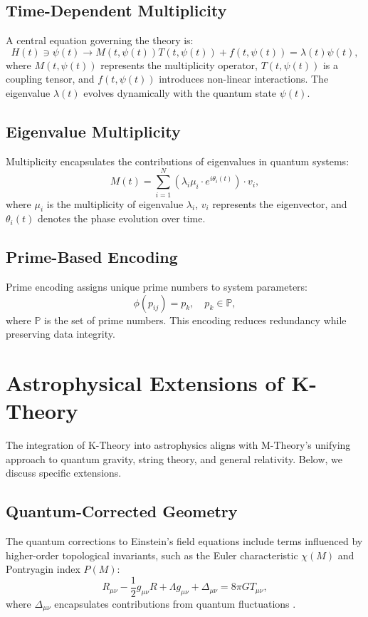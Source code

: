 \documentclass{article}
\theoremstyle{plain}
\begin{document}
\subsection{Time-Dependent Multiplicity}
A central equation governing the theory is:
\begin{equation}
H(t) \ni \psi(t) \to M(t, \psi(t)) T(t, \psi(t)) + f(t, \psi(t)) = \lambda(t) \psi(t),
\end{equation}
where $M(t, \psi(t))$ represents the multiplicity operator, $T(t, \psi(t))$ is a coupling tensor, and $f(t, \psi(t))$ introduces non-linear interactions. The eigenvalue $\lambda(t)$ evolves dynamically with the quantum state $\psi(t)$.

\subsection{Eigenvalue Multiplicity}
Multiplicity encapsulates the contributions of eigenvalues in quantum systems:
\begin{equation}
M(t) = \sum_{i=1}^{N} (\lambda_i \mu_i \cdot e^{i \theta_i(t)}) \cdot v_i,
\end{equation}
where $\mu_i$ is the multiplicity of eigenvalue $\lambda_i$, $v_i$ represents the eigenvector, and $\theta_i(t)$ denotes the phase evolution over time.

\subsection{Prime-Based Encoding}
Prime encoding assigns unique prime numbers to system parameters:
\begin{equation}
\phi(p_{ij}) = p_k, \quad p_k \in \mathbb{P},
\end{equation}
where $\mathbb{P}$ is the set of prime numbers. This encoding reduces redundancy while preserving data integrity.

\section{Astrophysical Extensions of K-Theory}
The integration of K-Theory into astrophysics aligns with M-Theory's unifying approach to quantum gravity, string theory, and general relativity. Below, we discuss specific extensions.

\subsection{Quantum-Corrected Geometry}
The quantum corrections to Einstein's field equations include terms influenced by higher-order topological invariants, such as the Euler characteristic $\chi(M)$ and Pontryagin index $P(M)$:
\begin{equation}
R_{\mu\nu} - \frac{1}{2}g_{\mu\nu}R + \Lambda g_{\mu\nu} + \Delta_{\mu\nu} = 8\pi G T_{\mu\nu},
\end{equation}
where $\Delta_{\mu\nu}$ encapsulates contributions from quantum fluctuations \cite{witten1995string}.
\end{document}
